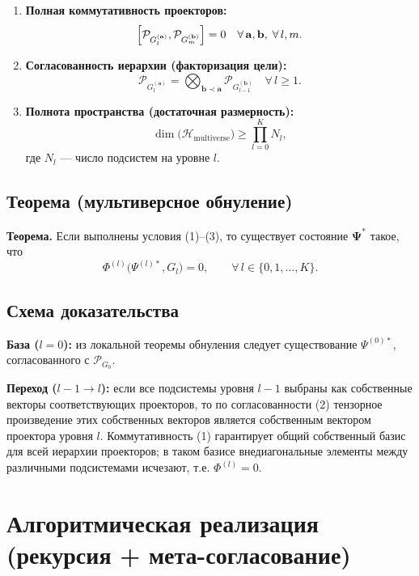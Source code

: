 \documentclass[11pt]{article}
\begin{document}
\begin{enumerate}[leftmargin=*, itemsep=4pt]
  \item \textbf{Полная коммутативность проекторов:}
  \[
    \comm{\mathcal{P}_{G_l^{(\mathbf{a})}}}{\mathcal{P}_{G_m^{(\mathbf{b})}}}=0
    \quad \forall\,\mathbf{a},\mathbf{b},\; \forall\,l,m.
  \]

  \item \textbf{Согласованность иерархии (факторизация цели):}
  \[
    \mathcal{P}_{G_l^{(\mathbf{a})}}
    = \bigotimes_{\mathbf{b}\prec\mathbf{a}} \mathcal{P}_{G_{l-1}^{(\mathbf{b})}}
    \quad \forall\, l\ge 1.
  \]

  \item \textbf{Полнота пространства (достаточная размерность):}
  \[
    \dim\bigl(\mathcal{H}_{\text{multiverse}}\bigr)\ge \prod_{l=0}^{K} N_l,
  \]
  где $N_l$ --- число подсистем на уровне $l$.
\end{enumerate}

\subsection{Теорема (мультиверсное обнуление)}

\textbf{Теорема.}
Если выполнены условия (1)--(3), то существует состояние $\mathbf{\Psi}^*$ такое, что
\[
\Phi^{(l)}\bigl(\Psi^{(l)*},G_l\bigr)=0,\qquad \forall\, l\in\{0,1,\dots,K\}.
\]

\subsection{Схема доказательства}

\textbf{База ($l=0$):} из локальной теоремы обнуления следует существование $\Psi^{(0)*}$, согласованного с $\mathcal{P}_{G_0}$.

\textbf{Переход ($l-1\to l$):}
если все подсистемы уровня $l-1$ выбраны как собственные векторы соответствующих проекторов, то по согласованности (2) тензорное произведение этих собственных векторов является собственным вектором проектора уровня $l$.
Коммутативность (1) гарантирует общий собственный базис для всей иерархии проекторов; в таком базисе внедиагональные элементы между различными подсистемами исчезают, т.е. $\Phi^{(l)}=0$.

\section{Алгоритмическая реализация (рекурсия + мета-согласование)}
\end{document}

